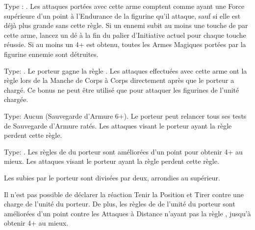 \closearmynewsection






\startarmymagicalitems

\armymagicalweapons

\startpricelist

 Type : \hw{}. Les attaques portées avec cette arme comptent comme ayant une Force supérieure d'un point à l'Endurance de la figurine qu'il attaque, sauf si elle est déjà plus grande sans cette règle. Si un ennemi subit au moins une touche de par cette arme, lancez un dé à la fin du palier d'Initiative actuel pour chaque touche réussie. Si au moins un 4+ est obtenu, toutes les Armes Magiques portées par la figurine ennemie sont détruites.

 Type: \lance{}. Le porteur gagne la règle . Les attaques effectuées avec cette arme ont la règle  lors de la Manche de Corps à Corps directement après que le porteur a chargé. Ce bonus ne peut être utilisé que pour attaquer les figurines de l'unité chargée.

\endpricelist

\armymagicalarmour

\startpricelist

 Type: Aucun (Sauvegarde d'Armure 6+). Le porteur peut relancer tous ses tests de Sauvegarde d'Armure ratés. Les attaques visant le porteur ayant la règle  perdent cette règle.

 Type: \ha{}. Les règles de \wardsave{} du porteur sont améliorées d'un point pour obtenir 4+ au mieux. Les attaques visant le porteur ayant la règle \holyattacks{} perdent cette règle.

\endpricelist

\armytalismans

\startpricelist

 Les \multiplewounds{}{} subies par le porteur sont divisées par deux, arrondies au supérieur.

 Il n'est pas possible de déclarer la réaction Tenir la Position et Tirer contre une charge de l'unité du porteur. De plus, les règles de \wardsave{} de l'unité du porteur sont améliorées d'un point contre les Attaques à Distance n'ayant pas la règle \magicalattacks{}, jusqu'à obtenir 4+ au mieux.

